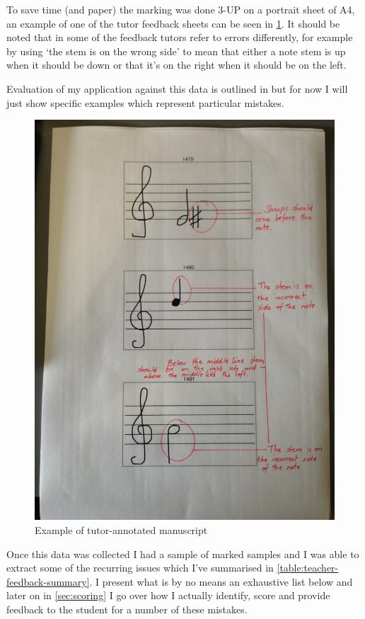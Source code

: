 To save time (and paper) the marking was done 3-UP on a portrait sheet of A4, an example of one of the tutor feedback sheets can be seen in \cref{fig:teacher-sheet}. It should be noted that in some of the feedback tutors refer to errors differently, for example by using `the stem is on the wrong side' to mean that either a note stem is up when it should be down or that it's on the right when it should be on the left.

Evaluation of my application against this data is outlined in  but for now I will just show specific examples which represent particular mistakes.

\begin{figure}[H]
  \centering
  \includegraphics[width=\linewidth]{gfx/photos/teacher-sheet-1.jpg}
  \caption{Example of tutor-annotated manuscript}
  \label{fig:teacher-sheet}
\end{figure}

Once this data was collected I had a sample of  marked samples  and I was able to extract some of the recurring issues which I've summarised in \cref{table:teacher-feedback-summary}. I present what is by no means an exhaustive list below and later on in \cref{sec:scoring} I go over how I actually identify, score and provide feedback to the student for a number of these mistakes.

